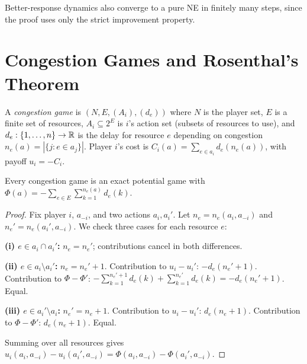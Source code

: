 \documentclass[11pt,a4paper]{article}
\begin{document}
\begin{corollary}
\label{cor:better-response}
Better-response dynamics also converge to a pure NE in finitely many
steps, since the proof uses only the strict improvement property.
\end{corollary}


\section{Congestion Games and Rosenthal's Theorem}
\label{sec:congestion}

\begin{definition}
\label{def:congestion-game}
A \emph{congestion game} is $(N, E, (A_i), (d_e))$ where $N$ is the
player set, $E$ is a finite set of resources, $A_i \subseteq 2^E$ is
$i$'s action set (subsets of resources to use), and
$d_e : \{1,\ldots,n\} \to \mathbb{R}$ is the delay for resource $e$ depending
on congestion $n_e(a) = |\{j : e \in a_j\}|$. Player $i$'s cost is
$C_i(a) = \sum_{e \in a_i}d_e(n_e(a))$, with payoff $u_i = -C_i$.
\end{definition}

\begin{keyresult}[title={Rosenthal's Theorem}]
\begin{theorem}
\label{thm:rosenthal}
Every congestion game is an exact potential game with
$\Phi(a) = -\sum_{e \in E}\sum_{k=1}^{n_e(a)}d_e(k)$.
\end{theorem}
\end{keyresult}

\begin{proof}
Fix player $i$, $a_{-i}$, and two actions $a_i, a_i'$. Let
$n_e = n_e(a_i, a_{-i})$ and $n_e' = n_e(a_i', a_{-i})$. We check
three cases for each resource $e$:

\textbf{(i) $e \in a_i \cap a_i'$:} $n_e = n_e'$; contributions
cancel in both differences.

\textbf{(ii) $e \in a_i \setminus a_i'$:} $n_e = n_e' + 1$.
Contribution to $u_i - u_i'$: $-d_e(n_e'+1)$.
Contribution to $\Phi - \Phi'$:
$-\sum_{k=1}^{n_e'+1}d_e(k) + \sum_{k=1}^{n_e'}d_e(k)
= -d_e(n_e'+1)$. Equal.

\textbf{(iii) $e \in a_i' \setminus a_i$:} $n_e' = n_e + 1$.
Contribution to $u_i - u_i'$: $d_e(n_e+1)$.
Contribution to $\Phi - \Phi'$: $d_e(n_e+1)$. Equal.

Summing over all resources gives
$u_i(a_i, a_{-i}) - u_i(a_i', a_{-i}) = \Phi(a_i, a_{-i})
- \Phi(a_i', a_{-i})$.
\end{proof}
\end{document}
